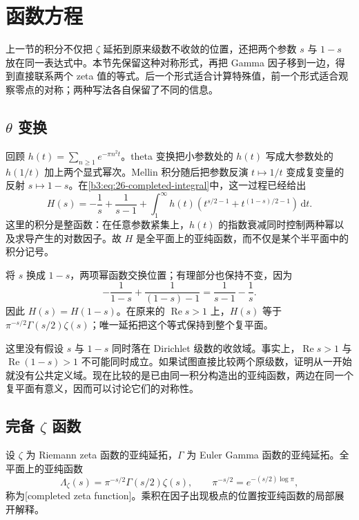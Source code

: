 \section{函数方程}
\label{b3:sec:2604}

上一节的积分不仅把 \(\zeta\) 延拓到原来级数不收敛的位置，还把两个参数 \(s\) 与 \(1-s\) 放在同一表达式中。本节先保留这种对称形式，再把 Gamma 因子移到一边，得到直接联系两个 zeta 值的等式。后一个形式适合计算特殊值，前一个形式适合观察零点的对称；两种写法各自保留了不同的信息。

\subsection{\texorpdfstring{\(\theta\)}{\AnalysisPdfTheta} 变换}
\label{b3:subsec:260401}

回顾 \(h(t)=\sum_{n\ge1}e^{-\pi n^2t}\)。theta 变换把小参数处的 \(h(t)\) 写成大参数处的 \(h(1/t)\) 加上两个显式幂次。Mellin 积分随后把参数反演 \(t\mapsto1/t\) 变成复变量的反射 \(s\mapsto1-s\)。在\eqref{b3:eq:26-completed-integral}中，这一过程已经给出
\[
 H(s)=-\frac1s+\frac1{s-1}
 +\int_1^\infty h(t)
   \left(t^{s/2-1}+t^{(1-s)/2-1}\right)\,\mathrm dt.
\]
这里的积分是整函数：在任意参数紧集上，\(h(t)\) 的指数衰减同时控制两种幂以及求导产生的对数因子。故 \(H\) 是全平面上的亚纯函数，而不仅是某个半平面中的积分记号。

将 \(s\) 换成 \(1-s\)，两项幂函数交换位置；有理部分也保持不变，因为
\[
 -\frac1{1-s}+\frac1{(1-s)-1}
 =\frac1{s-1}-\frac1s.
\]
因此 \(H(s)=H(1-s)\)。在原来的 \(\operatorname{Re}s>1\) 上，\(H(s)\) 等于 \(\pi^{-s/2}\Gamma(s/2)\zeta(s)\)；唯一延拓把这个等式保持到整个复平面。

这里没有假设 \(s\) 与 \(1-s\) 同时落在 Dirichlet 级数的收敛域。事实上，\(\operatorname{Re}s>1\) 与 \(\operatorname{Re}(1-s)>1\) 不可能同时成立。如果试图直接比较两个原级数，证明从一开始就没有公共定义域。现在比较的是已由同一积分构造出的亚纯函数，两边在同一个复平面有意义，因而可以讨论它们的对称性。

\subsection{完备 \texorpdfstring{\(\zeta\)}{\AnalysisPdfZeta} 函数}
\label{b3:subsec:260402}

\begin{definition}[完备 zeta 函数]\label{b3:def:26-completed-function}
设 \(\zeta\) 为 Riemann zeta 函数的亚纯延拓，\(\Gamma\) 为 Euler Gamma 函数的亚纯延拓。全平面上的亚纯函数
\[
 \Lambda_\zeta(s)=\pi^{-s/2}\Gamma(s/2)\zeta(s),
 \qquad \pi^{-s/2}=e^{-(s/2)\log\pi},
\]
称为[completed zeta function]。乘积在因子出现极点的位置按亚纯函数的局部展开解释。
\end{definition}


